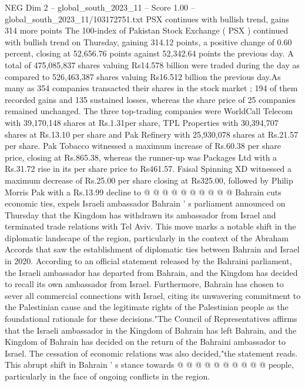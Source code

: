 \begin{textsample}{NEG Dim 2 – global\_south\_2023\_11 – Score 1.00 – global\_south\_2023\_11/103172751.txt}  \label{ex:f2_neg_229}
PSX continues with bullish trend, gains 314 more points The 100-index of Pakistan Stock Exchange ( PSX ) continued with bullish trend on Thursday, gaining 314.12 points, a positive change of 0.60 percent, closing at 52,656.76 points against 52,342.64 points the previous day.
A total of 475,085,837 shares valuing Rs14.578 billion were traded during the day as compared to 526,463,387 shares valuing Rs16.512 billion the previous day.As many as 354 companies transacted their shares in the stock market ; 194 of them recorded gains and 135 sustained losses, whereas the share price of 25 companies remained unchanged.
The three top-trading companies were WorldCall Telecom with 39,170,148 shares at Rs.1.31per share, TPL Properties with 30,394,707 shares at Rs.13.10 per share and Pak Refinery with 25,930,078 shares at Rs.21.57 per share.
Pak Tobacco witnessed a maximum increase of Rs.60.38 per share price, closing at Rs.865.38, whereas the runner-up was Packages Ltd with a Rs.31.72 rise in its per share price to Rs461.57.
Faisal Spinning XD witnessed a maximum decrease of Rs.25.00 per share closing at Rs325.00, followed by Philip Morris Pak with a Rs.13.99 decline to @ @ @ @ @ @ @ @ @ @ Bahrain cuts economic ties, expels Israeli ambassador Bahrain ' s parliament announced on Thursday that the Kingdom has withdrawn its ambassador from Israel and terminated trade relations with Tel Aviv.
This move marks a notable shift in the diplomatic landscape of the region, particularly in the context of the Abraham Accords that saw the establishment of diplomatic ties between Bahrain and Israel in 2020.
According to an official statement released by the Bahraini parliament, the Israeli ambassador has departed from Bahrain, and the Kingdom has decided to recall its own ambassador from Israel.
Furthermore, Bahrain has chosen to sever all commercial connections with Israel, citing its unwavering commitment to the Palestinian cause and the legitimate rights of the Palestinian people as the foundational rationale for these decisions."The Council of Representatives affirms that the Israeli ambassador in the Kingdom of Bahrain has left Bahrain, and the Kingdom of Bahrain has decided on the return of the Bahraini ambassador to Israel.
The cessation of economic relations was also decided,"the statement reads.
This abrupt shift in Bahrain ' s stance towards @ @ @ @ @ @ @ @ @ @ people, particularly in the face of ongoing conflicts in the region.

\end{textsample}

